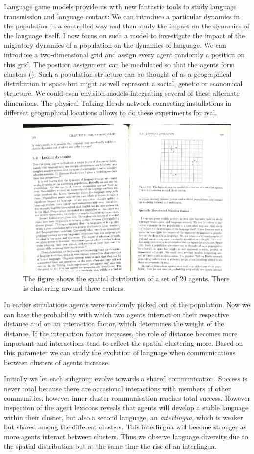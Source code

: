 Language game models provide us with new fantastic tools to study
language transmission and language contact: 
We can introduce a particular dynamics in the population
in a controlled way and then study the impact on the dynamics of the 
language itself. 
I now focus on such a model to investigate the impact of 
the migratory dynamics of a population on the dynamics 
of language. We can introduce a two-dimensional 
grid and assign every agent randomly
a position on this grid. The position assignment
can be modulated so that the agents form clusters
(). Such 
a population structure can be thought of as a 
geographical distribution in space but might as well 
represent a social, genetic or economical structure.
We could even envision models integrating
several of these alternate dimensions. The physical 
Talking Heads network connecting installations in 
different geographical locations allows to do these 
experiments for real. 
\begin{figure}[htbp]
  \centerline{\includegraphics[width=.40
\textwidth]{chap5/figs/fig-agent-distribution}}
\caption{\footnotesize The figure shows the spatial distribution of a set
of 20 agents. There is clustering around three centers.}
\label{figure-agent-distribution}
\end{figure}

In earlier simulations agents were randomly picked
out of the population. 
Now we can base the probability with which two agents interact
on their respective distance and on an
interaction factor, which determines the weight
of the distance. If the interaction factor increases, the
role of distance becomes more important and interactions tend to
reflect the spatial clustering more. Based on this
parameter we can study the evolution of
language when communications between clusters of agents 
increase. 

Initially we let each subgroup evolve towards a shared 
communication. 
Success is never total because there are occasional interactions
with members of other communities, however inner-cluster
communication reaches total success.
However inspection of the agent lexicons reveals that
agents will develop a stable
language within their cluster, but also a
second language, an {\itshape interlingua}, which is weaker but
shared among the different clusters. This interlingua will
become stronger as more agents interact between clusters.
Thus we observe language diversity due to
the spatial distribution but at the same time the rise 
of an interlingua.


